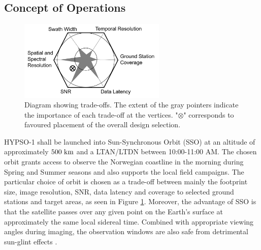 \subsection{Concept of Operations}
\begin{figure}[htbp]
  \begin{center}
    \includegraphics[width=70mm,angle=0]{figs/trade-off chart.png}
    \caption{Diagram showing trade-offs. The extent of the gray pointers indicate the importance of each trade-off at the vertices. "$\otimes$" corresponds to favoured placement of the overall design selection.}
    \label{fig:trade-off}
\end{center}
\end{figure}
HYPSO-1 shall be launched into Sun-Synchronous Orbit (SSO) at an altitude of approximately $500 \hspace{3pt} \rm{km}$ and a LTAN/LTDN between 10:00-11:00 AM. The chosen orbit grants access to observe the Norwegian coastline in the morning during Spring and Summer seasons and also supports the local field campaigns. The particular choice of orbit is chosen as a trade-off between mainly the footprint size, image resolution, SNR, data latency and coverage to selected ground stations and target areas, as seen in Figure \ref{fig:trade-off}. Moreover, the advantage of SSO is that the satellite passes over any given point on the Earth’s surface at approximately the same local sidereal time. Combined with appropriate viewing angles during imaging, the observation windows are also safe from detrimental sun-glint effects \cite{Kay2009}.

